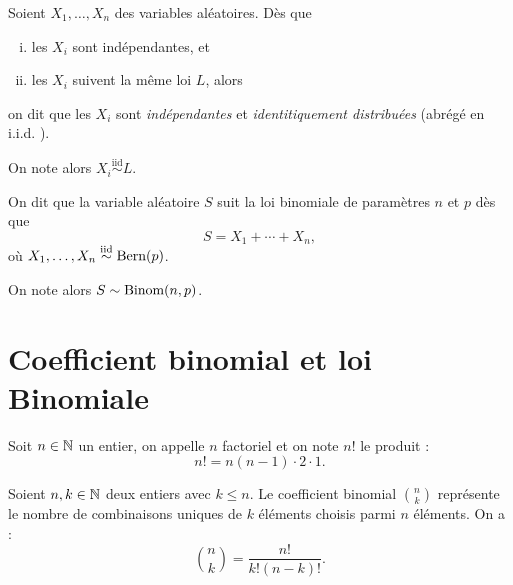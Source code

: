 \documentclass[a4paper, 12pt]{report}
\begin{document}
\begin{defn}[Variables i.i.d.]
	Soient $X_1, \dots, X_n$ des variables aléatoires.
	Dès que
	\begin{enumerate}[(i)]
		\item les $X_i$ sont indépendantes, et
		\item les $X_i$ suivent la même loi $L$, alors
	\end{enumerate}
	on dit que les $X_i$ sont \emph{indépendantes} et \emph{identitiquement distribuées} (abrégé en \og i.i.d. \fg).
\end{defn}

\begin{nota}
	On note alors $X_i \overset{\mathrm{iid}}{\sim} L$.
\end{nota}

\begin{defn}
	On dit que la variable aléatoire $S$ suit la loi binomiale de paramètres $n$ et $p$ dès que
		\[ S = X_1 + \cdots + X_n, \]
	où $X_1, \dots, X_n \overset{\mathrm{iid}}{\sim} \text{Bern}(p)$.
\end{defn}

\begin{nota}
	On note alors $S \sim \text{Binom}(n,p)$.
\end{nota}

\section{Coefficient binomial et loi Binomiale}

\begin{defn}[Factoriel]
Soit $n \in \mathbb{N}$ un entier, on appelle \og $n$ factoriel \fg{} et on note $n!$ le produit :
\[ n! = n(n-1) \cdot 2 \cdot 1 . \]
\end{defn}

\begin{defn}
Soient $n, k \in \mathbb{N}$ deux entiers avec $k \leq n$. 
Le coefficient binomial $\binom{n}{k}$ représente le nombre de combinaisons uniques de $k$ éléments choisis parmi $n$ éléments.
On a :
\[ \binom{n}{k} = \dfrac{n!}{k!(n-k)!} . \]
\end{defn}
\end{document}
